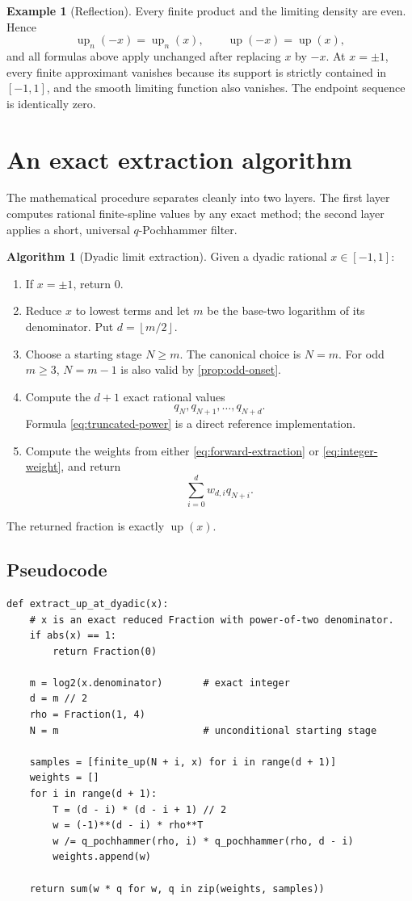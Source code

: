 \documentclass[11pt,oneside]{article}
\theoremstyle{definition}
\newtheorem{algorithm}[theorem]{Algorithm}
\newtheorem{example}[theorem]{Example}
\theoremstyle{remark}
\newcommand{\up}{\operatorname{up}}
\newcommand{\floor}[1]{\left\lfloor#1\right\rfloor}
\begin{document}
\begin{example}[Reflection]
Every finite product and the limiting density are even.  Hence
\[
 \up_n(-x)=\up_n(x),\qquad \up(-x)=\up(x),
\]
and all formulas above apply unchanged after replacing \(x\) by \(-x\).
At \(x=\pm1\), every finite approximant vanishes because its support is
strictly contained in \([-1,1]\), and the smooth limiting function also
vanishes.  The endpoint sequence is identically zero.
\end{example}

\section{An exact extraction algorithm}

The mathematical procedure separates cleanly into two layers.  The first
layer computes rational finite-spline values by any exact method; the second
layer applies a short, universal \(q\)-Pochhammer filter.

\begin{algorithm}[Dyadic limit extraction]\label{alg:extraction}
Given a dyadic rational \(x\in[-1,1]\):
\begin{enumerate}
 \item If \(x=\pm1\), return \(0\).
 \item Reduce \(x\) to lowest terms and let \(m\) be the base-two logarithm of
 its denominator.  Put \(d=\floor{m/2}\).
 \item Choose a starting stage \(N\ge m\).  The canonical choice is \(N=m\).
 For odd \(m\ge3\), \(N=m-1\) is also valid by \cref{prop:odd-onset}.
 \item Compute the \(d+1\) exact rational values
 \[
  q_N,q_{N+1},\ldots,q_{N+d}.
 \]
 Formula \eqref{eq:truncated-power} is a direct reference implementation.
 \item Compute the weights from either \eqref{eq:forward-extraction} or
 \eqref{eq:integer-weight}, and return
 \[
  \sum_{i=0}^{d}w_{d,i}q_{N+i}.
 \]
\end{enumerate}
The returned fraction is exactly \(\up(x)\).
\end{algorithm}

\subsection{Pseudocode}

\begin{lstlisting}[style=pythonstyle]
def extract_up_at_dyadic(x):
    # x is an exact reduced Fraction with power-of-two denominator.
    if abs(x) == 1:
        return Fraction(0)

    m = log2(x.denominator)       # exact integer
    d = m // 2
    rho = Fraction(1, 4)
    N = m                         # unconditional starting stage

    samples = [finite_up(N + i, x) for i in range(d + 1)]
    weights = []
    for i in range(d + 1):
        T = (d - i) * (d - i + 1) // 2
        w = (-1)**(d - i) * rho**T
        w /= q_pochhammer(rho, i) * q_pochhammer(rho, d - i)
        weights.append(w)

    return sum(w * q for w, q in zip(weights, samples))
\end{lstlisting}
\end{document}
